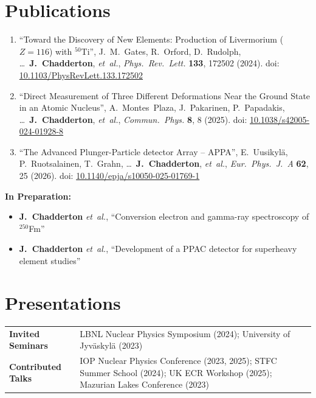 \documentclass[a4paper,11pt]{article}
\begin{document}
\section{Publications}
\begin{enumerate}[leftmargin=1.5em, itemsep=4pt, topsep=2pt]
    \item ``Toward the Discovery of New Elements: Production of Livermorium ($Z=116$) with $^{50}$Ti'',
    J.~M.~Gates, R.~Orford, D.~Rudolph, \ldots\ \textbf{J.~Chadderton}, \emph{et~al.},
    \textit{Phys.\ Rev.\ Lett.} \textbf{133}, 172502 (2024).
    doi: \href{https://doi.org/10.1103/PhysRevLett.133.172502}{10.1103/PhysRevLett.133.172502}

    \item ``Direct Measurement of Three Different Deformations Near the Ground State in an Atomic Nucleus'',
    A.~Montes~Plaza, J.~Pakarinen, P.~Papadakis, \ldots\ \textbf{J.~Chadderton}, \emph{et~al.},
    \textit{Commun.\ Phys.} \textbf{8}, 8 (2025).
    doi: \href{https://doi.org/10.1038/s42005-024-01928-8}{10.1038/s42005-024-01928-8}

    \item ``The Advanced Plunger-Particle detector Array -- APPA'',
    E.~Uusikyl\"{a}, P.~Ruotsalainen, T.~Grahn, \ldots\ \textbf{J.~Chadderton}, \emph{et~al.},
    \textit{Eur.\ Phys.\ J.\ A} \textbf{62}, 25 (2026).
    doi: \href{https://doi.org/10.1140/epja/s10050-025-01769-1}{10.1140/epja/s10050-025-01769-1}
\end{enumerate}

\textbf{In Preparation:}
\begin{itemize}[nosep, leftmargin=1.5em]
    \item \textbf{J.~Chadderton} \emph{et~al.}, ``Conversion electron and gamma-ray spectroscopy of $^{250}$Fm''
    \item \textbf{J.~Chadderton} \emph{et~al.}, ``Development of a PPAC detector for superheavy element studies''
\end{itemize}

\section{Presentations}
\begin{tabularx}{\linewidth}{@{}p{3.5cm} X@{}}
\textbf{Invited Seminars} & LBNL Nuclear Physics Symposium (2024); University of Jyv\"{a}skyl\"{a} (2023) \\[4pt]
\textbf{Contributed Talks} & IOP Nuclear Physics Conference (2023, 2025); STFC Summer School (2024); UK ECR Workshop (2025); Mazurian Lakes Conference (2023)
\end{tabularx}
\end{document}
